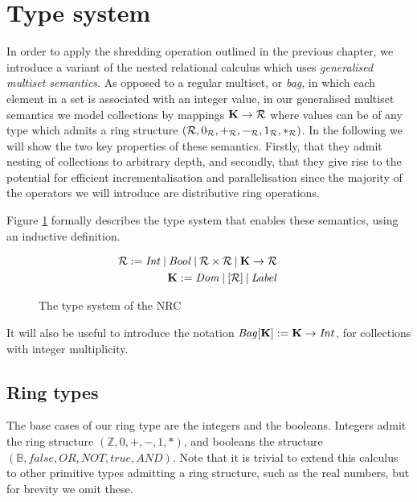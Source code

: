 \section{Type system} {

In order to apply the shredding operation outlined in the previous chapter, we introduce a variant of the nested relational calculus which uses \textit{generalised multiset semantics}. As opposed to a regular multiset, or \textit{bag}, in which each element in a set is associated with an integer value, in our generalised multiset semantics we model collections by mappings $ \mathbf{K} \rightarrow \mathcal{R} $ where values can be of any type which admits a ring structure $ (\mathcal{R},0_{\mathcal{R}},+_{\mathcal{R}},-_{\mathcal{R}},1_{\mathcal{R}},*_{\mathcal{R}}) $. In the following we will show the two key properties of these semantics. Firstly, that they admit nesting of collections to arbitrary depth, and secondly, that they give rise to the potential for efficient incrementalisation and parallelisation since the majority of the operators we will introduce are distributive ring operations.

Figure \ref{nrctypes} formally describes the type system that enables these semantics, using an inductive definition.

\begin{figure}
\begin{equation*}
\begin{aligned}
\mathcal{R} := \textrm{\textit{Int}} \: | \: \textrm{\textit{Bool}} \: | \: \mathcal{R} \times  \mathcal{R} \: | \: \mathbf{K} \rightarrow \mathcal{R} \\
\mathbf{K} := \textrm{\textit{Dom}} \: | \:  [\mathcal{R}]  \: | \: \textrm{\textit{Label}} \\
\end{aligned}
\qquad
\begin{aligned}
\end{aligned}
\end{equation*}
\caption{The type system of the NRC}
\label{nrctypes}
\end{figure}

It will also be useful to introduce the notation $\textrm{\textit{Bag}}[\mathbf{K}] := \mathbf{K} \rightarrow \textrm{\textit{Int}}$, for collections with integer multiplicity.

\subsection{Ring types} {
The base cases of our ring type are the integers and the booleans. Integers admit the ring structure $(\mathbb{Z},0,+,-,1,*)$, and booleans the structure $(\mathbb{B}, false,OR,NOT,true,AND)$. Note that it is trivial to extend this calculus to other primitive types admitting a ring structure, such as the real numbers, but for brevity we omit these. 

}}
